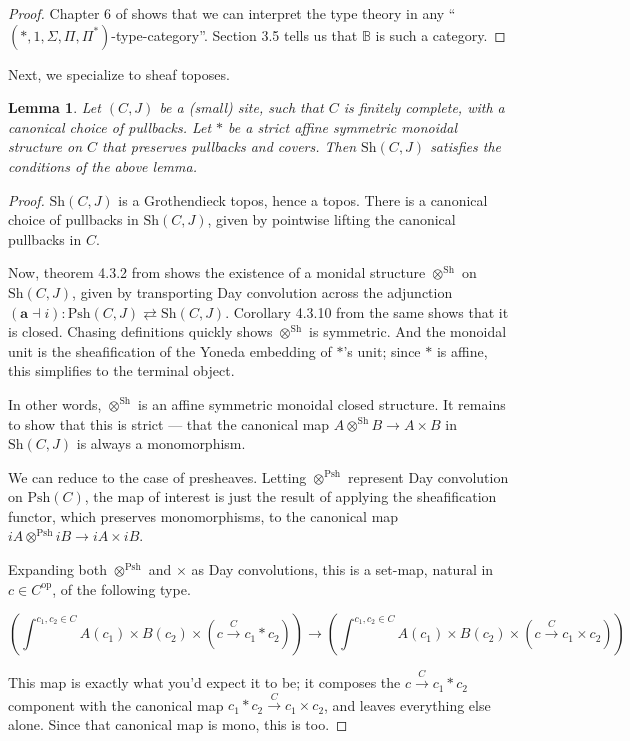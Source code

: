 \documentclass{article}
\newtheorem{lemma}[theorem]{Lemma}
\newcommand*{\Sh}{\mathrm{Sh}}
\newcommand*{\Psh}{\mathrm{Psh}}
\newcommand*{\B}{\mathbb{B}}
\begin{document}
\begin{proof}
    Chapter 6 of \cite{schopp} shows that we can interpret the type theory in any ``\((*, 1, \Sigma, \Pi, \Pi^*)\)-type-category''.
    Section 3.5 tells us that \(\B\) is such a category.
\end{proof}

Next, we specialize to sheaf toposes.

\begin{lemma} \label{sh}
    Let \((C,J)\) be a (small) site, such that \(C\) is finitely complete,
    with a canonical choice of pullbacks.
    Let \(*\) be a strict affine symmetric monoidal structure on \(C\) that preserves pullbacks and covers.
    Then \(\Sh(C,J)\) satisfies the conditions of the above lemma.
\end{lemma}

\begin{proof}
    \(\Sh(C,J)\) is a Grothendieck topos, hence a topos. There is a canonical choice of pullbacks in \(\Sh(C,J)\), given by pointwise lifting the canonical pullbacks in \(C\).

    Now, theorem 4.3.2 from \cite{biering} shows the existence of a monidal structure \(\otimes^\Sh\) on \(\Sh(C,J)\),
    given by transporting Day convolution across the adjunction \((\mathbf{a} \dashv i) : \Psh(C,J) \rightleftarrows \Sh(C,J)\).
    Corollary 4.3.10 from the same shows that it is closed.
    Chasing definitions quickly shows \(\otimes^\Sh\) is symmetric.
    And the monoidal unit is the sheafification of the Yoneda embedding of \(*\)'s unit;
    since \(*\) is affine, this simplifies to the terminal object.

    In other words, \(\otimes^\Sh\) is an affine symmetric monoidal closed structure.
    It remains to show that this is strict --- that the canonical map \(A \otimes^\Sh B \to A \times B\) in \(\Sh(C,J)\) is always a monomorphism.

    We can reduce to the case of presheaves.
    Letting \(\otimes^\Psh\) represent Day convolution on \(\Psh(C)\),
    the map of interest is just the result of applying the sheafification functor, which preserves monomorphisms, to the canonical map \(iA \otimes^\Psh iB \to iA \times iB\).

    Expanding both \(\otimes^\Psh\) and \(\times\) as Day convolutions,
    this is a set-map, natural in \(c \in C^\mathrm{op}\), of the following type.
    \begin{scriptsize}\[\left(\int^{c_1,c_2 \in C} A(c_1) \times B(c_2) \times (c \xrightarrow{C} c_1 * c_2)\right) \to \left(\int^{c_1,c_2 \in C} A(c_1) \times B(c_2) \times (c \xrightarrow{C} c_1 \times c_2)\right)\]\end{scriptsize}
    This map is exactly what you'd expect it to be; it composes the \(c \xrightarrow{C} c_1 * c_2\) component
    with the canonical map \(c_1 * c_2 \xrightarrow{C} c_1 \times c_2\), and leaves everything else alone.
    Since that canonical map is mono, this is too.
\end{proof}
\end{document}
